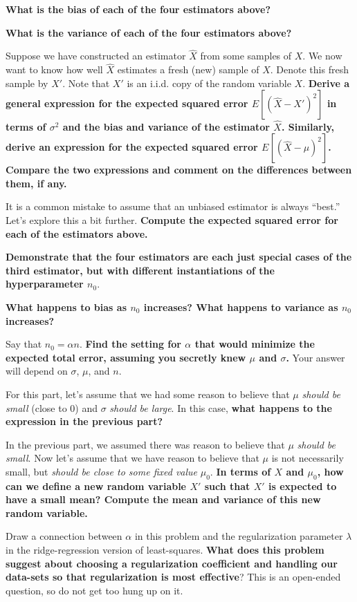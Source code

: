 \documentclass[preview]{standalone}
\begin{document}
\begin{Parts}
\Part \textbf{What is the bias of each of the four estimators above?}



\Part \textbf{What is the variance of each of the four estimators above?}



\Part 
Suppose we have constructed an estimator $\hat X$ from some samples of $X$.
We now want to know how well $\hat X$ estimates a fresh (new) sample of $X$.
Denote this fresh sample by $X'$.
Note that $X'$ is an i.i.d. copy of the random variable $X$.
\textbf{Derive a general expression for the expected squared error $E[(\hat{X} - X')^2] $ 
in terms of $\sigma^2$ and the bias and variance of the estimator $\hat X$. 
Similarly, derive an expression for the expected squared error $E[(\hat{X} - \mu)^2]$. Compare
the two expressions and comment on the differences between them, if any.}



\Part It is a common mistake to assume that an unbiased estimator
is always ``best.'' Let's explore this a bit further. \textbf{Compute the expected squared error for each of the estimators above.}


\Part \textbf{Demonstrate that the four estimators are each just
  special cases of the third estimator, but with different
  instantiations of the hyperparameter $n_0$}.



\Part \textbf{What happens to bias as $n_0$ increases? What happens to variance as $n_0$ increases?}



\Part Say that $n_0 = \alpha n$. 
\textbf{Find the setting for $\alpha$
  that would minimize the expected total error, assuming you secretly
  knew $\mu$ and $\sigma$.} Your answer will depend on $\sigma$, $\mu$, and $n$.



\Part For this part, let's assume that we had some reason to believe that $\mu$ \emph{should be small} (close to $0$) and $\sigma$ \emph{should be large}. In this case, \textbf{what happens to the expression in the previous part?}


\Part In the previous part, we assumed there was reason to believe that $\mu$ \emph{should be small}. Now let's assume that we have reason to believe that $\mu$ is not necessarily small, but \emph{should be close to some fixed value} $\mu_0$. \textbf{In terms of $X$ and $\mu_0$, how can we define a new random variable $X'$ such that $X'$ is expected to have a small mean? Compute the mean and variance of this new random variable.}



\Part Draw a connection between $\alpha$ in this problem and the
regularization parameter $\lambda$ in the ridge-regression version of least-squares. \textbf{What does this problem suggest
  about choosing a regularization coefficient and handling our
  data-sets so that regularization is most effective}? This is an
open-ended question, so do not get too hung up on it.



\end{Parts}
\end{document}
